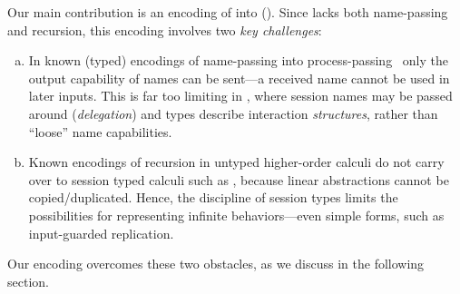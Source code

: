 Our main contribution is 
an encoding of \HOp into \HO ().  
Since \HO lacks 
both name-passing and recursion, this encoding involves two \emph{key challenges}:
\begin{enumerate}[a.]
\item In known (typed) 
encodings of name-passing into process-passing~\cite{SaWabook} %
only the output capability of names can be sent---a received name cannot be used in later inputs.
This is far too limiting in \HOp, where 
 session names %
 may be passed around (\emph{delegation})
and types describe interaction  \emph{structures}, rather than ``loose'' name capabilities. %



\item %
Known encodings of recursion in untyped higher-order calculi
do not carry over to session typed calculi such as \HOp,
because linear abstractions cannot be copied/duplicated. Hence, the discipline of session types  limits 
the possibilities for representing infinite behaviors---even simple forms, such as input-guarded replication.
\end{enumerate}





\noi
Our encoding overcomes these two obstacles, as we discuss in the following section.

